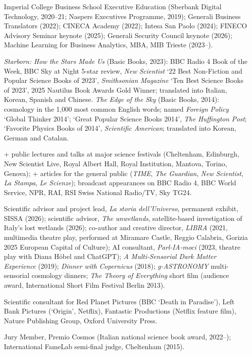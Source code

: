 Imperial College Business School Executive Education (Sberbank Digital Technology, 2020–21; Naspers Executives Programme, 2019); Generali Business Translators (2022); CINECA Academy (2022); Intesa San Paolo (2024); FINECO Advisory Seminar keynote (2025); Generali Security Council keynote (2026); Machine Learning for Business Analytics, MBA, MIB Trieste (2023–).


{\itshape Starborn: How the Stars Made Us} (Basic Books, 2023): BBC Radio 4 Book of the Week, BBC Sky at Night 5-star review, {\itshape New Scientist} `22 Best Non-Fiction and Popular Science Books of 2023', {\itshape Smithsonian Magazine} `Ten Best Science Books of 2023', 2025 Nautilus Book Awards Gold Winner; translated into Italian, Korean, Spanish and Chinese. {\itshape The Edge of the Sky} (Basic Books, 2014): cosmology in the 1{,}000 most common English words; named {\itshape Foreign Policy} `Global Thinker 2014';  `Great Popular Science Books 2014', {\em The Huffington Post}; `Favorite Physics Books of 2014', {\em Scientific American};
translated into Korean, German and Catalan.


+ public lectures and talks at major science festivals (Cheltenham, Edinburgh, New Scientist Live, Royal Albert Hall, Royal Institution, Mantova, Torino, Genova); + articles for the general public ({\itshape TIME}, {\itshape The Guardian}, {\itshape New Scientist}, {\itshape La Stampa}, {\itshape Le Scienze}); broadcast appearances on BBC Radio 4, BBC World Service, NPR, RAI, RSI Swiss National Radio/TV, Sky TG24.

Scientific advisor and project lead, {\itshape La storia dell'Universo}, permanent exhibit, SISSA (2026); scientific advisor, {\itshape The unwetlands}, satellite-based investigation of Italy's lost wetlands (2026); co-author and creative director, {\itshape LIBRA} (2021, multimedia theatre play, performed at Miramare Castle, Reggio Calabria, Gorizia 2025 European Capital of Culture); AI consultant, {\itshape Parl-IA-moci} (2023, theatre play with Diana H\"obel and ChatGPT); {\itshape A Multi-Sensorial Dark Matter Experience} (2019); {\itshape Dinner with Copernicus} (2018); {\itshape g-ASTRONOMY} multi-sensorial cosmology dinners; {\itshape The Theory of Everything} short film (audience award, International Short Film Festival Berlin 2013).

Scientific consultant for Red Planet Pictures (BBC `Death in Paradise'), Left Bank Pictures (`Origin', Netflix), Fantastic Productions (Netflix feature film), Nature Publishing Group, Oxford University Press.

Jury Member, Premio Cosmos (Italian national science book award, 2022–); International FameLab semi-final judge, Cheltenham (2015).

